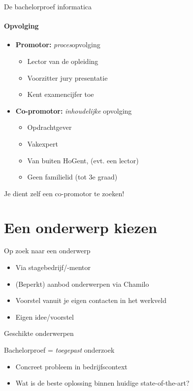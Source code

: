\documentclass[usenames,dvipsnames]{beamer}
\begin{document}
\begin{frame}{De bachelorproef informatica}
  \framesubtitle{Opvolging}
  
  \begin{itemize}
    \item \textbf{Promotor:} \emph{proces}opvolging
    \begin{itemize}
      \item Lector van de opleiding
      \item Voorzitter jury presentatie
      \item Kent examencijfer toe
    \end{itemize}
    \item \textbf{Co-promotor:} \emph{inhoudelijke} opvolging
    \begin{itemize}
      \item Opdrachtgever
      \item Vakexpert
      \item Van buiten HoGent, (evt. een lector)
      \item Geen familielid (tot 3e graad)
    \end{itemize}
  \end{itemize}

Je dient zelf een co-promotor te zoeken!

\end{frame}

\section{Een onderwerp kiezen}
\sectionframe{}

\begin{frame}{Op zoek naar een onderwerp}

\begin{itemize}
  \item Via stagebedrijf/-mentor
  \item (Beperkt) aanbod onderwerpen via Chamilo
  \item Voorstel vanuit je eigen contacten in het werkveld
  \item Eigen idee/voorstel
\end{itemize}

\end{frame}

\begin{frame}{Geschikte onderwerpen}

  Bachelorproef = \emph{toegepast} onderzoek
  
  \begin{itemize}
    \item Concreet probleem in bedrijfscontext
    \item Wat is de beste oplossing binnen huidige state-of-the-art?
  \end{itemize}

\end{frame}
\end{document}
